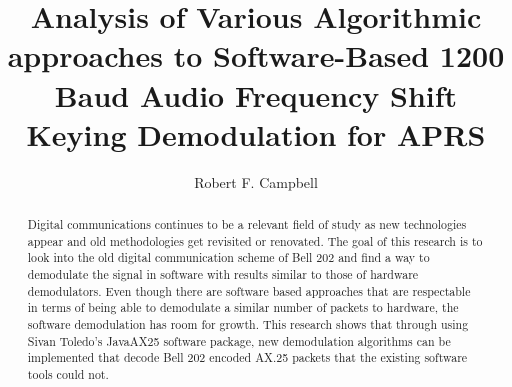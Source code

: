 \documentclass[12pt]{ucthesis}
\begin{document}
\title{Analysis of Various Algorithmic approaches to Software-Based 1200 Baud Audio Frequency Shift Keying Demodulation for APRS}
\author{Robert F. Campbell}
  
 
     
\maketitle

\begin{frontmatter}

\copyrightpage

\committeemembershippage

\begin{abstract}
Digital communications continues to be a relevant field of study as new technologies appear and old methodologies get revisited or renovated. The goal of this research is to look into the old digital communication scheme of Bell 202 \cite{stauffer1984fsk} and find a way to demodulate the signal in software with results similar to those of hardware demodulators. Even though there are software based approaches that are respectable in terms of being able to demodulate a similar number of packets to hardware, the software demodulation has room for growth. This research shows that through using Sivan Toledo's JavaAX25 \cite{javax25github} software package, new demodulation algorithms can be implemented that decode Bell 202 encoded AX.25 packets that the existing software tools could not.
\end{abstract}


\tableofcontents
\listoffigures

\end{frontmatter}















\end{document}
